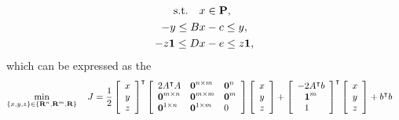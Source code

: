 \documentclass{article}
\begin{document}
    \begin{align*}
        \text{s.t.}\quad &x\in\textbf{P},
        \\
            -y \leq B &x - c \leq y,
            \\
            -z\textbf{1} \leq D &x - e \leq z\textbf{1},
    \end{align*}
    which can be expressed as the \QP
    \begin{align*}
        \min_{\{x,y,z\}\in\{\R^n,\R^m,\R\}} \quad 
        J & = \frac{1}{2}
        \left[\begin{array}{c}
            x   \\
            y   \\
            z
        \end{array}\right]^\tp
        \left[\begin{array}{lll}
            2A^\tp A
        &
            \zeros^{n\times m}
        &
            \zeros^{n}
        \\ 
            \zeros^{m\times n}
        &
            \zeros^{m\times m}
        &
            \zeros^{m}
        \\ 
            \zeros^{1\times n}
        &
            \zeros^{1\times m}
        &
            0
        \end{array}\right]
        \left[\begin{array}{c}
            x   \\
            y   \\
            z
        \end{array}\right]
        +
        \left[\begin{array}{l}
            -2 A^\tp b
            \\
            \minus \ones^{m}
            \\
            \minus 1
        \end{array}\right]^\tp
        \left[\begin{array}{c}
            x   \\
            y   \\
            z
        \end{array}\right]
        +
        b^\tp b
    \end{align*}
\end{document}
